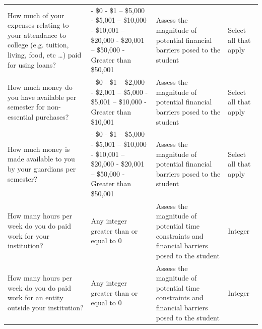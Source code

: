 \documentclass[10pt, twocolumn]{article}
\begin{document}
\begin{xltabular}{\textwidth}{|p{0.3\textwidth}|p{0.3\textwidth}|p{0.2\textwidth}|X|}
     \\ \hline
    How much of your expenses relating to your attendance to college (e.g. tuition, living, food, etc \dots) paid for using loans? & - \$0 \newline - \$1 -- \$5,000 \newline - \$5,001 -- \$10,000 \newline - \$10,001 -- \$20,000 \newline - \$20,001 -- \$50,000 \newline - Greater than \$50,001 & Assess the magnitude of potential financial barriers posed to the student & Select all that apply \\ \hline 
    How much money do you have available per semester for non-essential purchases? & - \$0 \newline - \$1 -- \$2,000 \newline - \$2,001 -- \$5,000 \newline - \$5,001 -- \$10,000 \newline - Greater than \$10,001 & Assess the magnitude of potential financial barriers posed to the student & Select all that apply \\ \hline 
    How much money is made available to you by your guardians per semester? & - \$0 \newline - \$1 -- \$5,000 \newline - \$5,001 -- \$10,000 \newline - \$10,001 -- \$20,000 \newline - \$20,001 -- \$50,000 \newline - Greater than \$50,001 & Assess the magnitude of potential financial barriers posed to the student & Select all that apply \\ \hline 
    How many hours per week do you do paid work for your institution? & Any integer greater than or equal to 0 & Assess the magnitude of potential time constraints and financial barriers posed to the student & Integer \\ \hline 
    How many hours per week do you do paid work for an entity outside your institution? & Any integer greater than or equal to 0 & Assess the magnitude of potential time constraints and financial barriers posed to the student & Integer \\ \hline 
    
\end{xltabular}

    
\end{document}
